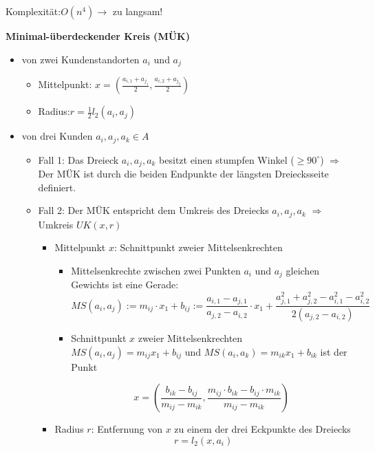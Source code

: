         \par Komplexität:$O(n^4) \rightarrow$ zu langsam!

        \par \textbf{Minimal-überdeckender Kreis (MÜK)}

        \begin{itemize}
          \item von zwei Kundenstandorten $a_i$ und $a_j$
            \begin{itemize}
               \item Mittelpunkt: $x = (\frac{a_{i,1}+a_{j_1}}{2}, \frac{a_{i,2}+a_{j_2}}{2})$
               \item Radius:$r = \frac{1}{2}l_2(a_i, a_j)$
             \end{itemize} 
          \item von drei Kunden $a_i, a_j, a_k \in A$
            \begin{itemize}
              \item Fall 1: Das Dreieck $a_i, a_j, a_k$ besitzt einen stumpfen Winkel ($ \geq 90^\circ$) $\Rightarrow$ Der MÜK ist durch die beiden Endpunkte der längsten Dreiecksseite definiert.
              \item Fall 2: Der MÜK entspricht dem Umkreis des Dreiecks $a_i, a_j, a_k$ $\Rightarrow$ Umkreis $UK(x,r)$
                \begin{itemize}
                   \item Mittelpunkt $x$: Schnittpunkt zweier Mittelsenkrechten
                    \begin{itemize}
                      \item Mittelsenkrechte zwischen zwei Punkten $a_i$ und $a_j$ gleichen Gewichts ist eine Gerade:
                      $$MS(a_i, a_j) := m_{ij} \cdot x_1 + b_{ij} := \frac{a_{i,1}-a_{j,1}}{a_{j,2}-a_{i,2}}\cdot x_1 + \frac{a_{j,1}^2 + a_{j,2}^2 - a_{i,1}^2 - a_{i,2}^2}{2(a_{j,2} - a_{i,2})}$$
                      \item Schnittpunkt $x$ zweier Mittelsenkrechten $MS(a_i, a_j) = m_{ij}x_1 + b_{ij}$ und $MS(a_i, a_k) = m_{ik}x_1 + b_{ik}$ ist der Punkt 

                      $$x = (\frac{b_{ik} - b_{ij}}{m_{ij} - m_{ik}}, \frac{m_{ij}\cdot b_{ik} - b_{ij}\cdot m_{ik}}{m_{ij}-m_{ik}})$$
                    \end{itemize}
                   \item Radius $r$: Entfernung von $x$ zu einem der drei Eckpunkte des Dreiecks 
                   $$r= l_2(x, a_i)$$
                 \end{itemize} 
            \end{itemize}
        \end{itemize}


